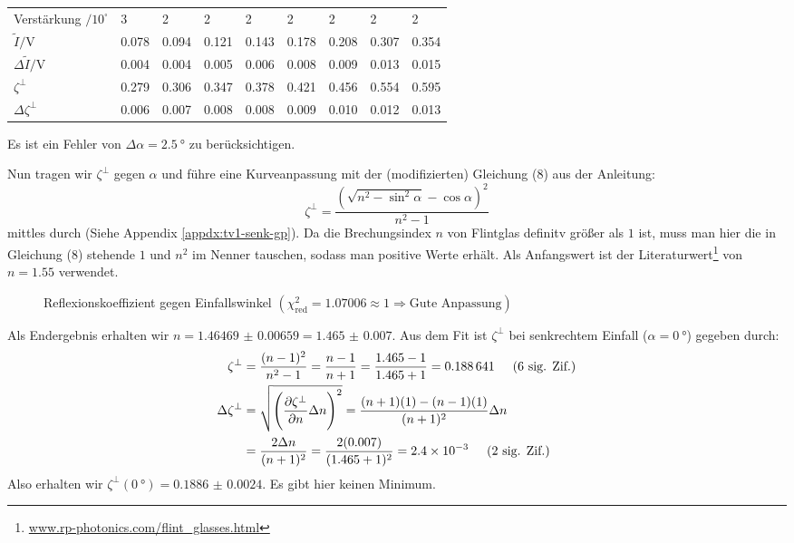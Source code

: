 \begin{center}
\begin{tabular}{@{} l  *{8}{l} @{}}
				Verstärkung $/10^\square$    & \num{3} & \num{2} & \num{2} & \num{2} & \num{2} & \num{2} & \num{2} & \num{2} \\
				$\tilde{I}/\si{\volt}$       & \num{0.078} & \num{0.094} & \num{0.121} & \num{0.143} & \num{0.178} & \num{0.208} & \num{0.307} & \num{0.354} \\
				$\Delta\tilde{I}/\si{\volt}$ & \num{0.004} & \num{0.004} & \num{0.005} & \num{0.006} & \num{0.008} & \num{0.009} & \num{0.013} & \num{0.015} \\
				\midrule
				$\zeta^{\bot}$               & \num{0.279} & \num{0.306} & \num{0.347} & \num{0.378} & \num{0.421} & \num{0.456} & \num{0.554} & \num{0.595} \\
				$\Delta\zeta^{\bot}$         & \num{0.006} & \num{0.007} & \num{0.008} & \num{0.008} & \num{0.009} & \num{0.010} & \num{0.012} & \num{0.013} \\
				\bottomrule
			\end{tabular}
		\end{center}
		Es ist ein Fehler von $\Delta \alpha = \SI{2.5}{\degree}$ zu berücksichtigen.

		Nun tragen wir $\zeta^{\bot}$ gegen $\alpha$ und führe eine Kurveanpassung mit der (modifizierten) Gleichung (8) aus der Anleitung:
		\begin{equation}
			\zeta^{\bot} = \frac{\left(\sqrt{n^2 - \sin^2\alpha} - \cos\alpha\right)^2}{n^2 - 1}
		\end{equation}
		mittles \gnuplot{} durch (Siehe Appendix \ref{appdx:tv1-senk-gp}). Da die Brechungsindex $n$ von Flintglas definitv größer als $1$ ist, muss man hier die in Gleichung (8) stehende $1$ und $n^2$ im Nenner tauschen, sodass man positive Werte erhält. Als Anfangswert ist der Literaturwert\footnote{\href{https://www.rp-photonics.com/flint_glasses.html}{www.rp-photonics.com/flint\_glasses.html}} von $n=\num{1.55}$ verwendet. 
		\begin{figure}[H]
			\centering
			
			\caption{\centering Reflexionskoeffizient gegen Einfallswinkel $(\chi^2_{\text{red}} = 1.07006 \approx 1 \Rightarrow \text{Gute Anpassung})$ }
			\label{fig:tvone-senk}
			\vspace{-1em}
		\end{figure}
		Als Endergebnis erhalten wir $n = \num{1.46469(659)} = \num{1.465(7)}$. Aus dem Fit ist $\zeta^\bot$ bei senkrechtem Einfall ($\alpha = \SI{0}{\degree}$) gegeben durch:
		\begin{align}
			\zeta^\bot &= \frac{(n-1)^2}{n^2 - 1} = \frac{n - 1}{n + 1} = \frac{\num{1.465} - 1}{\num{1.465} + 1} = \num{0.188641} \sigfig{6} \\
			\Delta\zeta^\bot &= \gausserror{\zeta^{\bot}}{n} = \frac{(n+1)(1) - (n-1)(1)}{(n+1)^2}\Delta n \notag \\
			&= \frac{2\Delta n}{(n+1)^2} = \frac{2(\num{0.007})}{(\num{1.465}+1)^2} = \num{2.4e-3} \sigfig{2}
		\end{align}
		Also erhalten wir $\zeta^\bot(\SI{0}{\degree}) = \num{0.1886(24)}$. Es gibt hier keinen Minimum.

